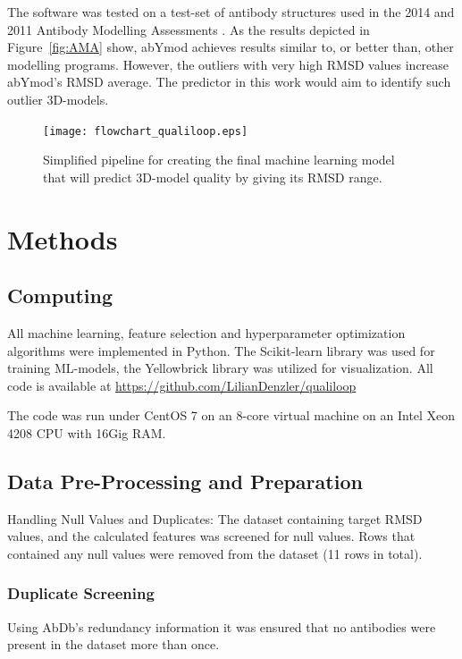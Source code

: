 \documentclass[12pt]{article}
\begin{document}
The software
was tested on a test-set of antibody structures used in the 2014 and
2011 Antibody Modelling Assessments
\cite{Almagro2011,Almagro2014}. As the results depicted in
Figure~\ref{fig:AMA} show, abYmod achieves results similar to, or better than,
other modelling programs. However, the outliers with very high RMSD
values increase abYmod's RMSD average. The predictor in this work
would aim to identify such outlier 3D-models.


\begin{figure}
  \centering
  \texttt{[image: flowchart\_qualiloop.eps]}
  \caption {Simplified pipeline for creating the final machine learning model that will predict 3D-model quality by giving its RMSD range.}
  \label{fig:flow}
\end{figure}
 
\section{Methods}

\subsection{Computing}
All machine learning, feature selection and hyperparameter
optimization algorithms were implemented in Python. The Scikit-learn
library was used for training ML-models, the
Yellowbrick\cite{Bengfort2021} library was utilized for
visualization. All code is available at
\url{https://github.com/LilianDenzler/qualiloop}

The code was run under CentOS 7 on an 8-core virtual machine on an
Intel Xeon 4208 CPU with 16Gig RAM.

\subsection{Data Pre-Processing and Preparation}
Handling Null Values and Duplicates: The dataset containing target
RMSD values, and the calculated features was screened for null
values.
Rows that contained any null values were
removed from the dataset (11 rows in total).

\subsubsection{Duplicate Screening}
Using AbDb's redundancy information it was ensured that no antibodies
were present in the dataset more than once.
\end{document}
